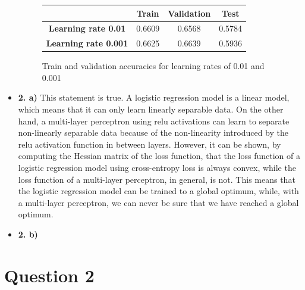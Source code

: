 \documentclass[12pt]{article}
\begin{document}
\begin{itemize}
\begin{figure}[H]
        \centering
        \begin{tabular}{|c|c|c|c|}
            \toprule
            & \textbf{Train} & \textbf{Validation} & \textbf{Test} \\
            \midrule
            \textbf{Learning rate 0.01} & 0.6609 & 0.6568 & 0.5784 \\
            \textbf{Learning rate 0.001} & 0.6625 & 0.6639 & 0.5936 \\
            \bottomrule
        \end{tabular}
        \label{tab:1b}
        \caption{Train and validation accuracies for learning rates of 0.01 and 0.001}
    \end{figure}
    \item \textbf{2. a)} This statement is true. A logistic regression model is a linear model, which means that it can only learn linearly separable data. On the other hand, a multi-layer perceptron using relu activations can learn to separate non-linearly separable data because of the non-linearity introduced by the relu activation function in between layers. However, it can be shown, by computing the Hessian matrix of the loss function, that the loss function of a logistic regression model using cross-entropy loss is always convex, while the loss function of a multi-layer perceptron, in general, is not. This means that the logistic regression model can be trained to a global optimum, while, with a multi-layer perceptron, we can never be sure that we have reached a global optimum.

    \item \textbf{2. b)} 
\end{itemize}

\section*{Question 2}
\end{document}
